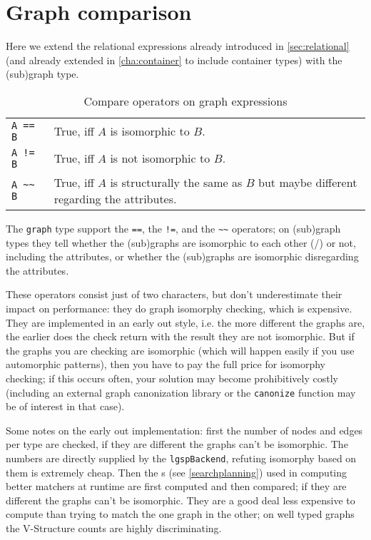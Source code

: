 

\section{Graph comparison}\label{sec:relationalgraph}

Here we extend the relational expressions already introduced in \ref{sec:relational} (and already extended in \ref{cha:container} to include container types) with the (sub)graph type.

\begin{table}[htbp]
  \centering
  \begin{tabularx}{\linewidth}{|l|X|} \hline
    \texttt{A == B} & True, iff $A$ is isomorphic to $B$. \\
    \texttt{A != B} & True, iff $A$ is not isomorphic to $B$. \\
    \texttt{A \textasciitilde\textasciitilde{ } B} & True, iff $A$ is structurally the same as $B$ but maybe different regarding the attributes. \\ \hline
  \end{tabularx}
  \caption{Compare operators on graph expressions}
  \label{compandgraph}
\end{table}

The \texttt{graph} type support the \texttt{==}, the \texttt{!=}, and the \texttt{\textasciitilde\textasciitilde} operators;
on (sub)graph types they tell whether the (sub)graphs are isomorphic to each other (/) or not, including the attributes, or whether the (sub)graphs are isomorphic disregarding the attributes.

These operators consist just of two characters, but don't underestimate their impact on performance:
they do graph isomorphy checking, which is expensive.
They are implemented in an early out style, i.e. the more different the graphs are, the earlier does the check return with the result they are not isomorphic.
But if the graphs you are checking are isomorphic (which will happen easily if you use automorphic patterns), then you have to pay the full price for isomorphy checking; if this occurs often, your solution may become prohibitively costly (including an external graph canonization library or the \texttt{canonize} function may be of interest in that case).

Some notes on the early out implementation: first the number of nodes and edges per type are checked, if they are different the graphs can't be isomorphic. The numbers are directly supplied by the \texttt{lgspBackend}, refuting isomorphy based on them is extremely cheap.
Then the s (see \ref{searchplanning}) used in computing better matchers at runtime are first computed and then compared; if they are different the graphs can't be isomorphic. They are a good deal less expensive to compute than trying to match the one graph in the other; on well typed graphs the V-Structure counts are highly discriminating.

